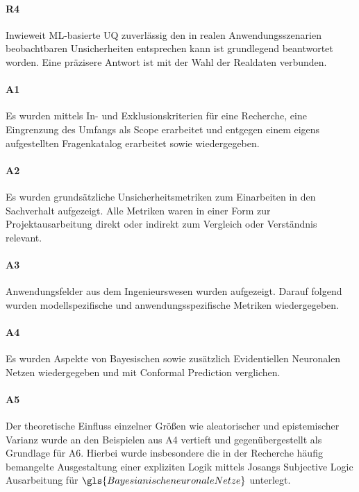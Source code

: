 \paragraph{R4} Inwieweit ML-basierte UQ zuverlässig den in realen Anwendungsszenarien beobachtbaren Unsicherheiten entsprechen kann ist grundlegend beantwortet worden. Eine präzisere Antwort ist mit der Wahl der Realdaten verbunden.  


\paragraph{A1} Es wurden mittels In- und Exklusionskriterien für eine Recherche, eine Eingrenzung des Umfangs als \glqq{}Scope\grqq{} erarbeitet und entgegen einem eigens aufgestellten Fragenkatalog erarbeitet sowie wiedergegeben.


\paragraph{A2} Es wurden grundsätzliche Unsicherheitsmetriken zum Einarbeiten in den Sachverhalt aufgezeigt. Alle Metriken waren in einer Form zur Projektausarbeitung direkt oder indirekt zum Vergleich oder Verständnis relevant.  


\paragraph{A3} Anwendungsfelder aus dem Ingenieurswesen wurden aufgezeigt. Darauf folgend wurden modellspezifische und anwendungsspezifische Metriken wiedergegeben. 


\paragraph{A4} Es wurden Aspekte von Bayesischen sowie zusätzlich Evidentiellen Neuronalen Netzen wiedergegeben und mit Conformal Prediction verglichen. 


\paragraph{A5} Der theoretische Einfluss einzelner Größen wie aleatorischer und epistemischer Varianz wurde an den Beispielen aus A4 vertieft und gegenübergestellt als Grundlage für A6. Hierbei wurde insbesondere die in der Recherche häufig bemangelte Ausgestaltung einer expliziten Logik mittels Josangs \glqq{}Subjective Logic\grqq{} Ausarbeitung für $\gls{Bayesianische neuronale Netze}$ unterlegt. 


